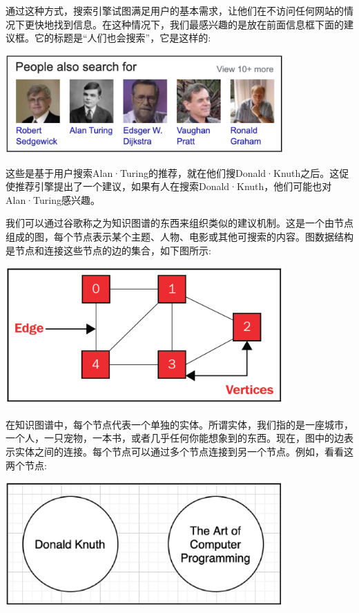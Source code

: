 通过这种方式，搜索引擎试图满足用户的基本需求，让他们在不访问任何网站的情况下更快地找到信息。在这种情况下，我们最感兴趣的是放在前面信息框下面的建议框。它的标题是“人们也会搜索”，它是这样的: \par

\begin{center}
	\includegraphics[width=0.8\textwidth]{content/Section-3/Chapter-16/9}
\end{center}

这些是基于用户搜索Alan·Turing的推荐，就在他们搜Donald·Knuth之后。这促使推荐引擎提出了一个建议，如果有人在搜索Donald·Knuth，他们可能也对Alan·Turing感兴趣。 \par
我们可以通过谷歌称之为知识图谱的东西来组织类似的建议机制。这是一个由节点组成的图，每个节点表示某个主题、人物、电影或其他可搜索的内容。图数据结构是节点和连接这些节点的边的集合，如下图所示: \par

\begin{center}
	\includegraphics[width=0.8\textwidth]{content/Section-3/Chapter-16/10}
\end{center}

在知识图谱中，每个节点代表一个单独的实体。所谓实体，我们指的是一座城市，一个人，一只宠物，一本书，或者几乎任何你能想象到的东西。现在，图中的边表示实体之间的连接。每个节点可以通过多个节点连接到另一个节点。例如，看看这两个节点: \par

\begin{center}
	\includegraphics[width=0.8\textwidth]{content/Section-3/Chapter-16/11}
\end{center}


